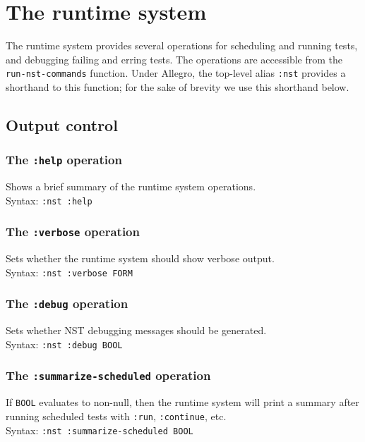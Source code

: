 \section{The runtime system}

The runtime system provides several operations for scheduling and
running tests, and debugging failing and erring tests.  The operations
are accessible from the
\texttt{run-nst-commands}
function.  Under Allegro, the top-level alias
\texttt{:nst} provides a shorthand to this
function; for the sake of brevity we use this shorthand below.

\subsection{Output control}
\subsubsection{The \texttt{:help} operation}
%
Shows a brief summary of the runtime system operations.
\\ Syntax: \texttt{:nst :help}

\subsubsection{The \texttt{:verbose} operation}
%
Sets whether the runtime system should show verbose output.
\\ Syntax: \texttt{:nst :verbose FORM}

\subsubsection{The \texttt{:debug} operation}
%
Sets whether NST debugging messages should be generated.
\\ Syntax: \texttt{:nst :debug BOOL}

\subsubsection{The \texttt{:summarize-scheduled} operation}
%
If \texttt{BOOL} evaluates to non-null, then the runtime system will
print a summary after running scheduled tests with \texttt{:run},
\texttt{:continue}, etc.
\\ Syntax: \texttt{:nst :summarize-scheduled BOOL}

